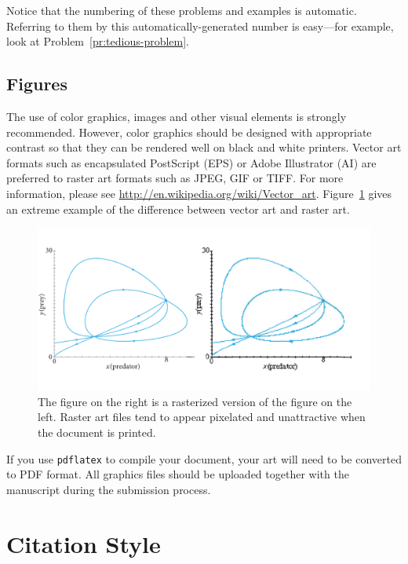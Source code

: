 \documentclass{codee}
\theoremstyle{definition}
\theoremstyle{remark}
\numberwithin{equation}{section}
\begin{document}
Notice that the numbering of these problems and examples is
automatic. Referring to them by this automatically-generated number is
easy---for example, look at Problem~\ref{pr:tedious-problem}.


\subsection{Figures}

The use of color graphics, images and other visual elements is
strongly recommended. However, color graphics should be designed with
appropriate contrast so that they can be rendered well on black and
white printers. Vector art formats such as encapsulated PostScript
(EPS) or Adobe Illustrator (AI) are preferred to raster art formats
such as JPEG, GIF or TIFF. For more information, please see
\url{http://en.wikipedia.org/wiki/Vector_art}. Figure~\ref{fig:vector-vs-raster}
gives an extreme example of the difference between vector art and
raster art.

\begin{figure}[b!] %
  \centering
  \includegraphics[width=6in,keepaspectratio=true]{vector-vs-raster}
  \caption{The figure on the right is a rasterized version of the
    figure on the left. Raster art files tend to appear pixelated and
    unattractive when the document is printed.}
  \label{fig:vector-vs-raster}
\end{figure}

If you use \texttt{pdflatex} to compile your document, your art will
need to be converted to PDF format. All graphics files should be uploaded together with
the manuscript during the submission process. 

\section{Citation Style}
\end{document}
